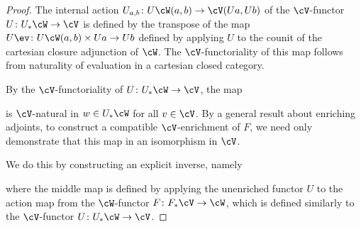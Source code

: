 \begin{proof}
The internal action $U_{a,b} \colon U\cW(a,b) \to \cV(Ua,Ub)$ of the $\cV$-functor $U \colon U_*\cW \to \cV$ is defined by the transpose of the map $U\ev \colon U\cW(a,b) \times Ua \to Ub$ defined by applying $U$ to the counit of the cartesian closure adjunction of $\cW$. The $\cV$-functoriality of this map follows from naturality of evaluation in a cartesian closed category.


By the $\cV$-functoriality of $U \colon U_*\cW \to \cV$, the map
\begin{center}
\end{center}
is $\cV$-natural in $w \in U_*\cW$ for all $v \in \cV$. By a general result about enriching adjoints,  %
to construct a compatible $\cV$-enrichment of $F$, we need only demonstrate that this map in an isomorphism in $\cV$.

We do this by constructing an explicit inverse, namely
\begin{center}
\end{center}
where the middle map is defined by applying the unenriched functor $U$ to the action map from the $\cW$-functor $F \colon F_*\cV \to \cW$, which is defined similarly to the $\cV$-functor $U \colon U_*\cW \to \cV$.


\end{proof}

